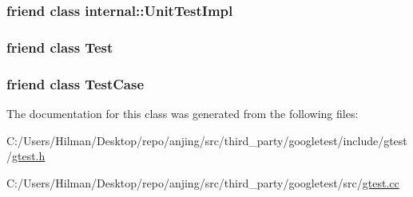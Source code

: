 \subsubsection[{internal\+::\+Unit\+Test\+Impl}]{\setlength{\rightskip}{0pt plus 5cm}friend class {\bf internal\+::\+Unit\+Test\+Impl}\hspace{0.3cm}{\ttfamily [friend]}}\label{classtesting_1_1_test_info_acc0a5e7573fd6ae7ad1878613bb86853}
\hypertarget{classtesting_1_1_test_info_a5b78b1c2e1fa07ffed92da365593eaa4}{}
\subsubsection[{Test}]{\setlength{\rightskip}{0pt plus 5cm}friend class {\bf Test}\hspace{0.3cm}{\ttfamily [friend]}}\label{classtesting_1_1_test_info_a5b78b1c2e1fa07ffed92da365593eaa4}
\hypertarget{classtesting_1_1_test_info_aff779e55b06adfa7c0088bd10253f0f0}{}
\subsubsection[{Test\+Case}]{\setlength{\rightskip}{0pt plus 5cm}friend class {\bf Test\+Case}\hspace{0.3cm}{\ttfamily [friend]}}\label{classtesting_1_1_test_info_aff779e55b06adfa7c0088bd10253f0f0}


The documentation for this class was generated from the following files\+:\begin{DoxyCompactItemize}
\item 
C\+:/\+Users/\+Hilman/\+Desktop/repo/anjing/src/third\+\_\+party/googletest/include/gtest/\hyperlink{gtest_8h}{gtest.\+h}\item 
C\+:/\+Users/\+Hilman/\+Desktop/repo/anjing/src/third\+\_\+party/googletest/src/\hyperlink{gtest_8cc}{gtest.\+cc}\end{DoxyCompactItemize}
